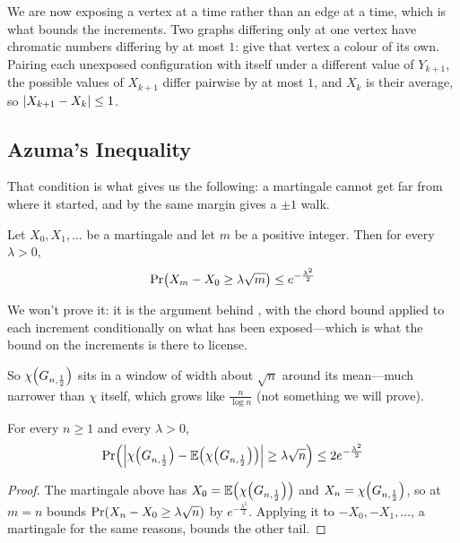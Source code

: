 We are now exposing a vertex at a time rather than an edge at a time, which is what bounds the increments. Two graphs differing only at one vertex have chromatic numbers differing by at most $1$: give that vertex a colour of its own. Pairing each unexposed configuration with itself under a different value of $Y_{k+1}$, the possible values of $X_{k+1}$ differ pairwise by at most $1$, and $X_k$ is their average, so $\left\lvert X_{k+1} - X_k \right\rvert \leq 1$.

\subsection{Azuma's Inequality}

That condition is what gives us the following: a martingale cannot get far from where it started, and by the same margin  gives a $\pm 1$ walk.

\begin{boxtheorem} \label{Ch4:Thm:Azuma}
    Let $X_0, X_1, \ldots$ be a martingale and let $m$ be a positive integer. Then for every $\lambda > 0$,
    \begin{align*}
        \Pr\!\left( X_m - X_0 \geq \lambda \sqrt{m} \right) \leq e^{-\frac{\lambda^2}{2}}
    \end{align*}
\end{boxtheorem}

We won't prove it: it is the argument behind , with the chord bound applied to each increment conditionally on what has been exposed---which is what the bound on the increments is there to license.

So $\chi\!\left( G_{n, \frac{1}{2}} \right)$ sits in a window of width about $\sqrt{n}$ around its mean---much narrower than $\chi$ itself, which grows like $\frac{n}{\log n}$ (not something we will prove).

\begin{boxcorollary} \label{Ch4:Cor:Chromatic_Concentration}
    For every $n \geq 1$ and every $\lambda > 0$,
    \begin{align*}
        \Pr\!\left( \left\lvert \chi\!\left( G_{n, \frac{1}{2}} \right) - \mathbb{E}\!\left( \chi\!\left( G_{n, \frac{1}{2}} \right) \right) \right\rvert \geq \lambda \sqrt{n} \right) \leq 2 e^{-\frac{\lambda^2}{2}}
    \end{align*}
\end{boxcorollary}
\begin{proof}
    The martingale above has $X_0 = \mathbb{E}\!\left( \chi\!\left( G_{n, \frac{1}{2}} \right) \right)$ and $X_n = \chi\!\left( G_{n, \frac{1}{2}} \right)$, so  at $m = n$ bounds $\Pr\!\left( X_n - X_0 \geq \lambda \sqrt{n} \right)$ by $e^{-\frac{\lambda^2}{2}}$. Applying it to $-X_0, -X_1, \ldots$, a martingale for the same reasons, bounds the other tail.
\end{proof}

